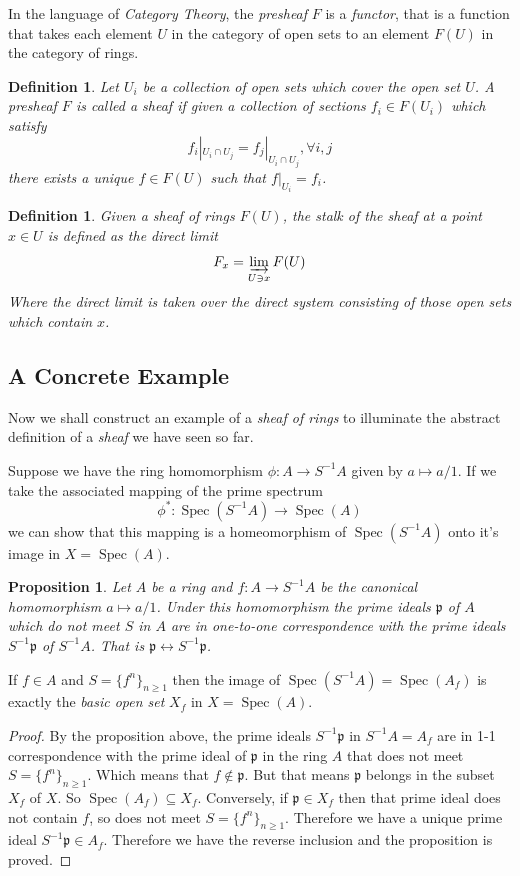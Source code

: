 \documentclass[]{report}
\newtheorem{prop}[theorem]{Proposition}
\newtheorem{defn}[theorem]{Definition}
\DeclareMathOperator\Spec{Spec}
\newcommand\byS{S^{-1}}
\begin{document}
In the language of \textit{Category Theory}, the \textit{presheaf} $F$ is a \textit{functor}, that is a function that takes each element $U$ in the category of open sets to an element $F(U)$ in the category of rings.

\begin{defn}
    Let  $U_i$ be a collection of open sets which cover the open set $U$. A presheaf $F$ is called a sheaf if given a collection of sections $f_i \in F(U_i)$ which satisfy  
    $$f_i |_{U_i \cap U_j} = f_j |_{U_i \cap U_j}, \forall i,j$$
   there exists a unique $f \in F(U)$ such that $f|_{U_i} = f_i$.
\end{defn}

\begin{defn}
    Given a sheaf of rings $F(U)$, the stalk of the sheaf at a point $x \in U$ is defined as the direct limit
    $$F_x = \varinjlim_{U \ni x} F(U)$$
    Where the direct limit is taken over the direct system consisting of those open sets which contain $x$. 
\end{defn}


\subsection{A Concrete Example}

Now we shall construct an example of a \textit{sheaf of rings} to illuminate the abstract definition of a \textit{sheaf} we have seen so far.

Suppose we have the ring homomorphism $\phi: A \rightarrow \byS A$ given by $a \mapsto a/1$. If we take the associated mapping of the prime spectrum
    $$\phi^* : \Spec(\byS A) \rightarrow \Spec(A)$$
    we can show that this mapping is a homeomorphism of $\Spec(\byS A)$ onto it's image in $X = \Spec(A)$. 

\begin{prop}
Let $A$ be a ring and $f: A \rightarrow \byS A$ be the canonical homomorphism $a \mapsto a/1$. Under this homomorphism the prime ideals $\mathfrak{p}$ of $A$ which do not meet $S$ in $A$ are in one-to-one correspondence with the prime ideals $\byS \mathfrak{p}$ of $\byS A$. That is $\mathfrak{p} \leftrightarrow \byS \mathfrak{p}$.
\end{prop}


If $f \in A$ and $S = \{f^n\}_{n\geq1}$ then the image of $\Spec(\byS A) = \Spec(A_f)$ is exactly the \textit{basic open set} $X_f$ in $X = \Spec(A)$.

\begin{proof}
    By the proposition above, the prime ideals $\byS \mathfrak{p}$ in 
$\byS A = A_f$ are in 1-1 correspondence with the prime ideal of $\mathfrak{p}$ in the ring $A$ that does not meet $S = \{f^n\}_{n \geq 1}$. Which means that $f \not \in \mathfrak{p}$. But that means $\mathfrak{p}$ belongs in the subset $X_f$ of $X$. So $\Spec(A_f) \subseteq X_f$. Conversely, if $\mathfrak{p} \in X_f$ then that prime ideal does not contain $f$, so does not meet $S = \{f^n\}_{n \geq 1}$. Therefore we have a unique prime ideal $\byS \mathfrak{p} \in A_f$. Therefore we have the reverse inclusion and the proposition is proved.
\end{proof}
\end{document}
